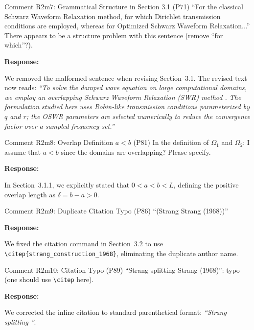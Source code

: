 \documentclass[11pt,a4paper]{article}
\newenvironment{response}{
    \par\vspace{1mm}\noindent\textbf{\textcolor{responseframe}{Response:}}\par\vspace{1mm}
}{
    \par\vspace{3mm}
}
\begin{document}
\begin{revcomment}{Comment R2m7: Grammatical Structure in Section 3.1 (P71)}
``For the classical Schwarz Waveform Relaxation method, for which Dirichlet transmission conditions are employed, whereas for Optimized Schwarz Waveform Relaxation...'' There appears to be a structure problem with this sentence (remove ``for which''?).
\end{revcomment}

\begin{response}
We removed the malformed sentence when revising Section~3.1. The revised text now reads: \emph{``To solve the damped wave equation on large computational domains, we employ an overlapping Schwarz Waveform Relaxation (SWR) method \citep{gander_optimal_2003}. The formulation studied here uses Robin-like transmission conditions parameterized by $q$ and $r$; the OSWR parameters are selected numerically to reduce the convergence factor over a sampled frequency set.''}
\end{response}

\begin{revcomment}{Comment R2m8: Overlap Definition $a < b$ (P81)}
In the definition of $\Omega_1$ and $\Omega_2$: I assume that $a < b$ since the domains are overlapping? Please specify.
\end{revcomment}

\begin{response}
In Section~3.1.1, we explicitly stated that $0 < a < b < L$, defining the positive overlap length as $\delta = b - a > 0$.
\end{response}

\begin{revcomment}{Comment R2m9: Duplicate Citation Typo (P86)}
``(Strang Strang (1968))''
\end{revcomment}

\begin{response}
We fixed the citation command in Section~3.2 to use \texttt{\textbackslash citep\{strang\_construction\_1968\}}, eliminating the duplicate author name.
\end{response}

\begin{revcomment}{Comment R2m10: Citation Typo (P89)}
``Strang splitting Strang (1968)'': typo (one should use \texttt{\textbackslash citep} here).
\end{revcomment}

\begin{response}
We corrected the inline citation to standard parenthetical format: \emph{``Strang splitting \citep{strang_construction_1968}''}.
\end{response}
\end{document}
